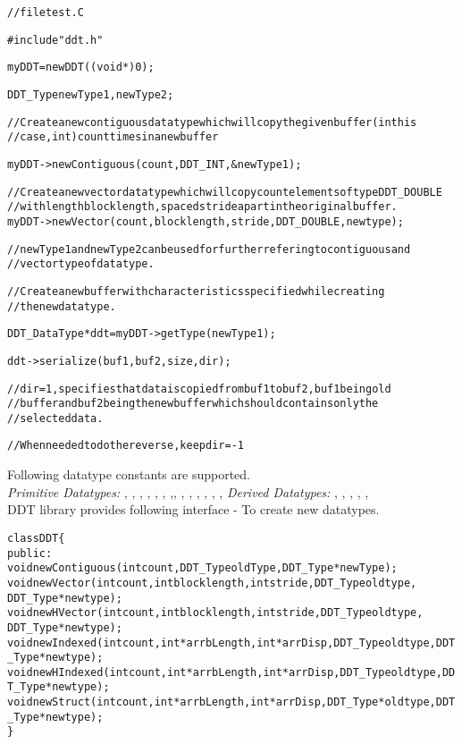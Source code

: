 \begin{alltt}
//file test.C

#include "ddt.h"

myDDT = new DDT((void*)0);

DDT_Type  newType1, newType2 ;

//Create a new contiguous datatype which will copy the given buffer (in this
// case, int) count times in a new buffer

myDDT->newContiguous(count, DDT_INT, \&newType1) ;

//Create a new vector datatype which will copy count elements of type DDT_DOUBLE
// with length blocklength, spaced stride apart in the original buffer. 
myDDT->newVector(count, blocklength, stride, DDT_DOUBLE, newtype);

//newType1 and newType2 can be used for further refering to contiguous and
//vector type of datatype.

// Create a new buffer with characteristics specified while creating
// the new datatype.

DDT_DataType *ddt = myDDT->getType(newType1);

ddt->serialize(buf1, buf2, size, dir);

// dir = 1, specifies that data is copied from buf1 to buf2, buf1 being old 
// buffer and buf2 being the new buffer which should contains only the 
// selected data.

//When needed to do the reverse, keep dir = -1
\end{alltt}
Following datatype constants are supported.\\
{\em Primitive Datatypes:}
\newline
{}, , , , , , ,,  , , , , , ,    
{\em Derived Datatypes:}
\newline
{}, , , , ,  \\
\vspace*{0.1in}
DDT library provides following interface
- To create new datatypes. 
\begin{alltt}
class DDT \{
	public:
	void newContiguous(int count, DDT\_Type  oldType, DDT\_Type* newType);
	void newVector(int count, int blocklength, int stride, DDT\_Type oldtype, 
			  DDT\_Type* newtype) ;
	void newHVector(int count, int blocklength, int stride, DDT\_Type oldtype, 
			   DDT\_Type* newtype);
	void newIndexed(int count, int* arrbLength, int* arrDisp , DDT\_Type oldtype, DDT\_Type* newtype);
	void newHIndexed(int count, int* arrbLength, int* arrDisp , DDT\_Type oldtype, DDT\_Type* newtype);
	void newStruct(int count, int* arrbLength, int* arrDisp , DDT\_Type *oldtype, DDT\_Type* newtype);
\}
\end{alltt}


